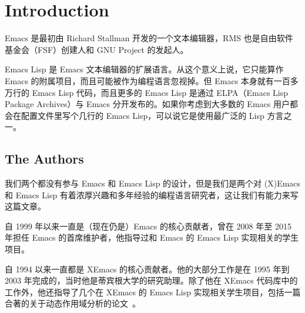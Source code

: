 \documentclass[format=acmsmall,screen]{acmart}
\begin{document}





\maketitle

\clearpage
\tableofcontents

\section{Introduction}

Emacs 是最初由 Richard Stallman 开发的一个文本编辑器，RMS 也是自由软件基金会（FSF）创建人和 GNU Project 的发起人。

Emacs Lisp 是 Emacs 文本编辑器的扩展语言。从这个意义上说，它只能算作 Emacs 的附属项目，而且可能被作为编程语言忽视掉。但 Emacs 本身就有一百多万行的 Emacs Lisp 代码，而且更多的 Emacs Lisp 是通过 ELPA（Emacs Lisp Package Archives）与 Emacs 分开发布的。如果你考虑到大多数的 Emacs 用户都会在配置文件里写个几行的 Emacs Lisp，可以说它是使用最广泛的 Lisp 方言之一。


\subsection{The Authors}

我们两个都没有参与 Emacs 和 Emacs Lisp 的设计，但是我们是两个对 (X)Emacs 和 Emacs Lisp 有着浓厚兴趣和多年经验的编程语言研究者，这让我们有能力来写这篇文章。

\smallskip

 自 1999 年以来一直是（现在仍是）Emacs 的核心贡献者，曾在 2008 年至 2015 年担任 Emacs 的首席维护者，他指导过和 Emacs 的 Emacs Lisp 实现相关的学生项目。

\smallskip

 自 1994 以来一直都是 XEmacs 的核心贡献者。他的大部分工作是在 1995 年到 2003 年完成的，当时他是蒂宾根大学的研究助理。除了他在 XEmacs 代码库中的工作外，他还指导了几个在 XEmacs 的 Emacs Lisp 实现相关学生项目，包括一篇合著的关于动态作用域分析的论文~\cite{Neubauer01}。
\end{document}
